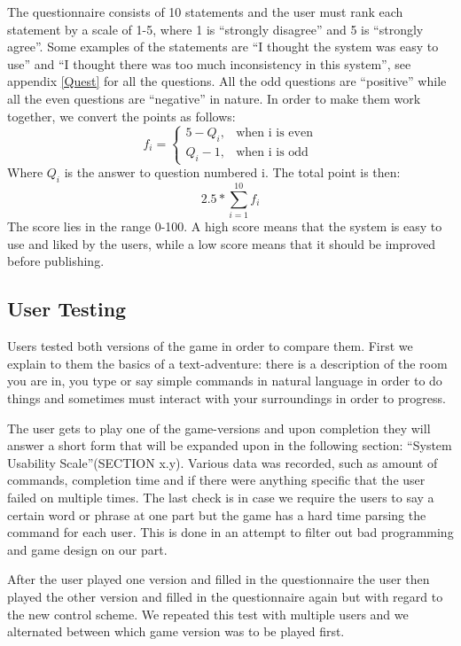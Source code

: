 The questionnaire consists of 10 statements and the user must rank each statement by a scale of 1-5, where 1 is “strongly disagree” and 5 is “strongly agree”. Some examples of the statements are “I thought the system was easy to use” and “I thought there was too much inconsistency in this system”, see appendix \ref{Quest} for all the questions. All the odd questions are ``positive'' while all the even questions are ``negative'' in nature. In order to make them work together, we convert the points as follows: 
\[
    f_{i} = 
\begin{cases}
    5 - Q_{i}, & \text{when i is even}\\
    Q_{i} - 1, & \text{when i is odd}
\end{cases}
\]
Where \(Q_{i} \) is the answer to question numbered i. The total point is then: 
\[ 2.5 * \displaystyle \sum_{i=1}^{10} f_{i} \]
The score lies in the range 0-100. A high score means that the system is easy to use and liked by the users, while a low score means that it should be improved before publishing. \citep{Broo}

\subsection{User Testing}
Users tested both versions of the game in order to compare them. First we explain to them the basics of a text-adventure: there is a description of the room you are in, you type or say simple commands in natural language in order to do things and sometimes must interact with your surroundings in order to progress. 

The user gets to play one of the game-versions and upon completion they will answer a short form that will be expanded upon in the following section: “System Usability Scale”(SECTION x.y). Various data was recorded, such as amount of commands, completion time and if there were anything specific that the user failed on multiple times. The last check is in case we require the users to say a certain word or phrase at one part but the game has a hard time parsing the command for each user. This is done in an attempt to filter out bad programming and game design on our part.

After the user played one version and filled in the questionnaire the user then played the other version and filled in the questionnaire again but with regard to the new control scheme. We repeated this test with multiple users and we alternated between which game version was to be played first.